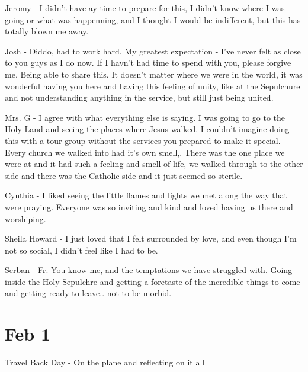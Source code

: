 \documentclass[letterpaper]{report}
\begin{document}
Jeromy - I didn't have ay time to prepare for this, I didn't know where I was going or what was happenning,  and I thought I would be indifferent, but this has totally blown me away.

Josh - Diddo,  had to work hard. My greatest expectation - I've never felt as close to you guys as I do now.  If I havn't had time to spend with you, please forgive me. Being able to share this.  It doesn't matter where we were in the world, it was wonderful having you here and having this feeling of unity, like at the Sepulchure and not understanding anything in the service, but still just being united.

Mrs. G - I agree with what everything else is saying.  I was going to go to the Holy Land and seeing the places where Jesus walked. I couldn't imagine doing this with a tour group without the services you prepared to make it special.
Every church we walked into had it's own smell,. There was the one place we were at and it had such a feeling and smell of life, we walked through to the other side and there was the Catholic side and it just seemed so sterile.

Cynthia - I liked seeing the little flames and lights we met along the way that were praying. Everyone was so inviting and kind and loved having us there and worshiping.

Sheila Howard - I just loved that I felt surrounded by love, and even though I'm not so social, I didn't feel like I had to be.

Serban - Fr. You know me, and the temptations we have struggled with. Going inside the Holy Sepulchre and getting a foretaste of the incredible things to come and getting ready to leave.. not to be morbid. 

\section{Feb 1}
Travel Back Day - On the plane and reflecting on it all
\end{document}
